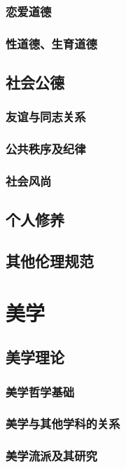 \documentclass[UTF8]{../RepresentationUniverse}
\begin{document}
    \subsection{恋爱道德}
    \subsection{性道德、生育道德}

\section{社会公德}
    \subsection{友谊与同志关系}
    \subsection{公共秩序及纪律}
    \subsection{社会风尚}

\section{个人修养}
\section{其他伦理规范}





\chapter{美学}

\section{美学理论}
\subsection{美学哲学基础}
\subsection{美学与其他学科的关系}
\subsection{美学流派及其研究}
\end{document}
